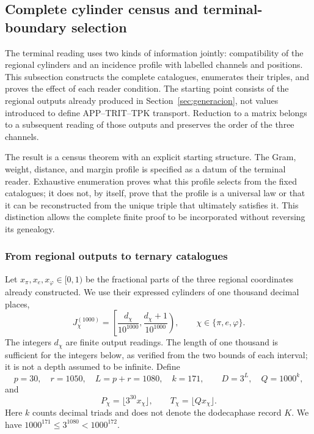 \subsection{Complete cylinder census and terminal-boundary selection}
\label{censo:terminal-completo}

The terminal reading uses two kinds of information jointly: compatibility
of the regional cylinders and an incidence profile with labelled channels
and positions. This subsection constructs the complete catalogues,
enumerates their triples, and proves the effect of each reader condition.
The starting point consists of the regional outputs already produced in
Section~\ref{sec:generacion}, not values introduced to define
APP--TRIT--TPK transport. Reduction to a matrix belongs to a subsequent
reading of those outputs and preserves the order of the three channels.

The result is a census theorem with an explicit starting structure.
The Gram, weight, distance, and margin profile is specified as a datum
of the terminal reader. Exhaustive enumeration proves what this profile
selects from the fixed catalogues; it does not, by itself, prove that
the profile is a universal law or that it can be reconstructed from the
unique triple that ultimately satisfies it. This distinction allows the
complete finite proof to be incorporated without reversing its genealogy.

\subsubsection{From regional outputs to ternary catalogues}

Let \(x_\pi,x_e,x_\varphi\in[0,1)\) be the fractional parts of the
three regional coordinates already constructed. We use their expressed
cylinders of one thousand decimal places,
\[
 J_\chi^{(1000)}=
 \left[\frac{d_\chi}{10^{1000}},
       \frac{d_\chi+1}{10^{1000}}\right),
 \qquad \chi\in\{\pi,e,\varphi\}.
\]
The integers \(d_\chi\) are finite output readings. The length of one thousand
is sufficient for the integers below, as verified from the two bounds
of each interval; it is not a depth assumed to be infinite.
Define
\begin{equation}
 p=30,\quad r=1050,\quad L=p+r=1080,\quad k=171,
 \qquad D=3^L,\quad Q=1000^k,
 \label{censo:parametros}
\end{equation}
and
\[
 P_\chi=\lfloor3^{30}x_\chi\rfloor,\qquad
 T_\chi=\lfloor Qx_\chi\rfloor.
\]
Here \(k\) counts decimal triads and does not denote the dodecaphase
record \(K\). We have \(1000^{171}\leq3^{1080}<1000^{172}\).


